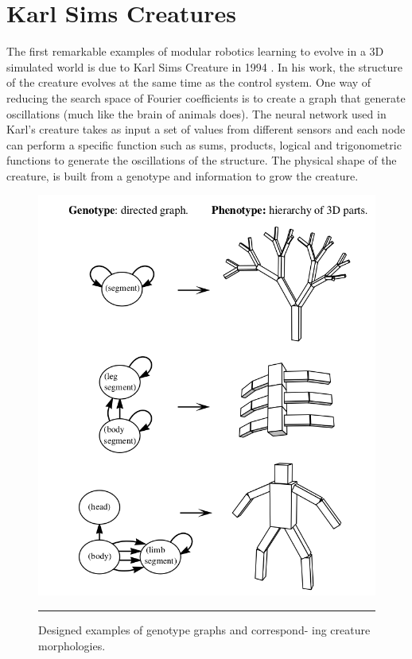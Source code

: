 \section{Karl Sims Creatures}
The first remarkable examples of modular robotics learning to evolve in a 3D simulated world is due to Karl Sims Creature in 1994 \cite{karl}. In his work, the structure of the creature evolves at the same time as the control system. One way of reducing the search space of Fourier coefficients is to create a graph that generate oscillations (much like the brain of animals does). The neural network used in Karl's creature takes as input a set of values from different sensors and each node can perform a specific function such as sums, products, logical and trigonometric functions to generate the oscillations of the structure. The physical shape of the creature, is built from a genotype and information to grow the creature.   
 
\begin{figure}[htbp]
    \centering
    \includegraphics[scale=0.3]{Figures/sims_genotype.png}
    \rule{35em}{0.5pt}
    \caption[Designed examples of genotype graphs and correspond-
    ing creature morphologies.]{Designed examples of genotype graphs and correspond-
    ing creature morphologies.}
    \label{fig:sims_genotype}
\end{figure}

